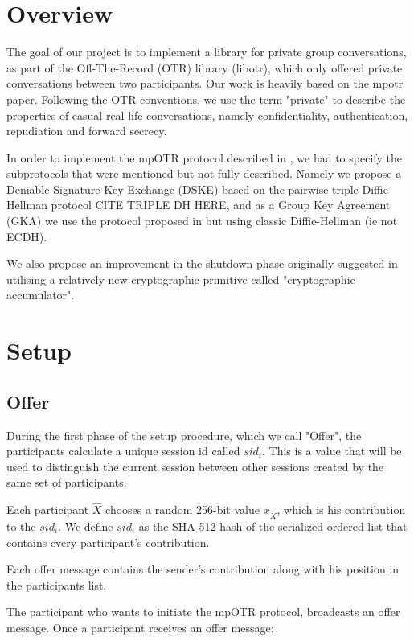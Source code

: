 \documentclass[12pt,titlepage,a4paper]{article}
\begin{document}
{
\section{Overview}
The goal of our project is to implement a library for private group conversations, as part of the Off-The-Record (OTR) library (libotr), which only offered private conversations between two participants. Our work is heavily based on the mpotr \cite{mpotr} paper. Following the OTR conventions, we use the term "private" to describe the properties of casual real-life conversations, namely confidentiality, authentication, repudiation and forward secrecy.

In order to implement the mpOTR protocol described in \cite{mpotr}, we had to specify the subprotocols that were mentioned but not fully described. Namely we propose a Deniable Signature Key Exchange (DSKE) based on the pairwise triple Diffie-Hellman protocol CITE TRIPLE DH HERE, and as a  Group Key Agreement (GKA) we use the protocol proposed in \cite{mpenc} but using classic Diffie-Hellman (ie not ECDH).

We also propose an improvement in the shutdown phase originally suggested in \cite{mpotr}
utilising a relatively new cryptographic primitive called "cryptographic accumulator".

\section{Setup}

\subsection{Offer}
\label{Offer}
During the first phase of the setup procedure, which we call "Offer", the participants calculate a unique session id called $sid_i$. This is a value that will be used to distinguish the current session between other sessions created by the same set of participants.

Each participant $\hat{X}$ chooses a random 256-bit value $x_{\hat{X}}$, which is his contribution to the $sid_i$. We define $sid_i$ as the SHA-512 hash of the serialized ordered list that contains every participant's contribution.

Each offer message contains the sender's contribution along with his position in the participants list.

The participant who wants to initiate the mpOTR protocol, broadcasts an offer message. Once a participant receives an offer message:

}
\end{document}
